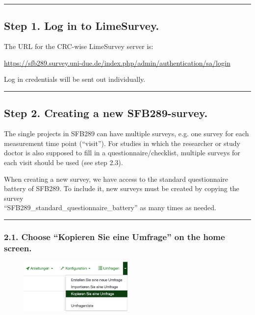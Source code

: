 \par\noindent\rule{\textwidth\color{pniblue}}{0.4pt}
\subsection*{Step 1. Log in to LimeSurvey.}
The URL for the CRC-wise LimeSurvey server is:

\hyperref[https://sfb289.survey.uni-due.de/index.php/admin/authentication/sa/login]{https://sfb289.survey.uni-due.de/index.php/admin/authentication/sa/login}

Log in credentials will be sent out individually. 


\small\setlength\fboxsep{5pt}\setlength\fboxrule{1pt}

\large
\par\noindent\rule{\textwidth\color{pniblue}}{0.4pt}
\subsection*{ Step 2. Creating a new SFB289-survey.}
The single projects in SFB289 can have multiple surveys, e.g. one survey for each measurement time point (“visit”). For studies in which the researcher or study doctor is also supposed to fill in a questionnaire/checklist, multiple surveys for each visit should be used (see step 2.3).

When creating a new survey, we have access to the standard questionnaire battery of SFB289. To include it, new surveys must be created by copying the survey \\ “SFB289\_standard\_questionnaire\_battery” as many times as needed. 

\par\noindent\rule{\textwidth\color{pniblue}}{0.4pt}
\subsubsection*{2.1. Choose “Kopieren Sie eine Umfrage” on the home screen.}
\begin{figure}[H]
\includegraphics[width=0.5\textwidth]{docs/fig/ls_sop2.1.png}
\end{figure}

